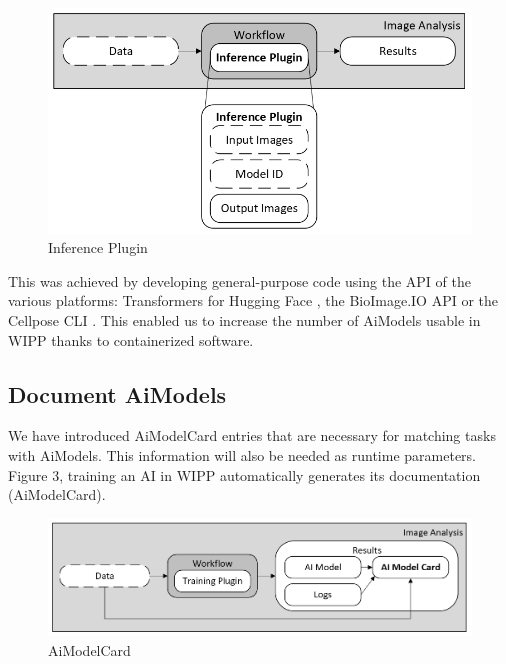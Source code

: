 \begin{figure}[H]
  \centering
  \includegraphics[width=1.0\linewidth]{png/2_inference_plugin.png}
  \caption{Inference Plugin}
  \label{fig:2inference}
\end{figure}

This was achieved by developing general-purpose code using the \Gls{API} of
the various platforms: Transformers \cite{Transformers_HuggingFace} for Hugging
Face \cite{HuggingFace}, the BioImage.IO API \cite{BioImageIoAPI} or the
Cellpose \Gls{CLI} \cite{CellposeCLI}. This
enabled us to increase the number of \Gls{AiModel}s usable
in \Gls{WIPP} thanks to containerized software.

\subsection{Document \Gls{AiModel}s}

We have introduced \Gls{AiModelCard} entries that are necessary for matching tasks
with \Gls{AiModel}s. This information will also be needed as runtime parameters.
Figure 3, training an \Gls{AI} in \Gls{WIPP} automatically generates its documentation
(\Gls{AiModelCard}).

\begin{figure}[H]
  \centering
  \includegraphics[width=1.0\linewidth]{png/3_ai_model_card.png}
  \caption{\Gls{AiModelCard}}
  \label{fig:3aimodelcard}
\end{figure}

